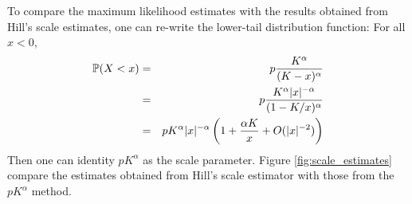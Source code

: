\documentclass[11pt,a4]{amsart}
\renewcommand{\P }{{\mathbb P}}
\newcommand{\1}{{\mathbf 1}}
\begin{document}
To compare the maximum likelihood estimates with the results obtained
from Hill's scale estimates, one can re-write the lower-tail
distribution function: For all $x < 0$,
\begin{eqnarray*}
  \P(X < x)
  &=&
  p {K^\alpha \over (K - x)^\alpha} \\
  &=&
  p {K^\alpha |x|^{-\alpha} \over (1 - K/x)^\alpha} \\
  &=&
  p K^\alpha |x|^{-\alpha} \left(
  1 + {\alpha K \over x} + O(|x|^{-2})
  \right)
\end{eqnarray*}
Then one can identity $p K^\alpha$ as the scale parameter. Figure
\ref{fig:scale_estimates} compare the estimates obtained
from Hill's scale estimator with those from the $p K^\alpha$ method.
\end{document}

